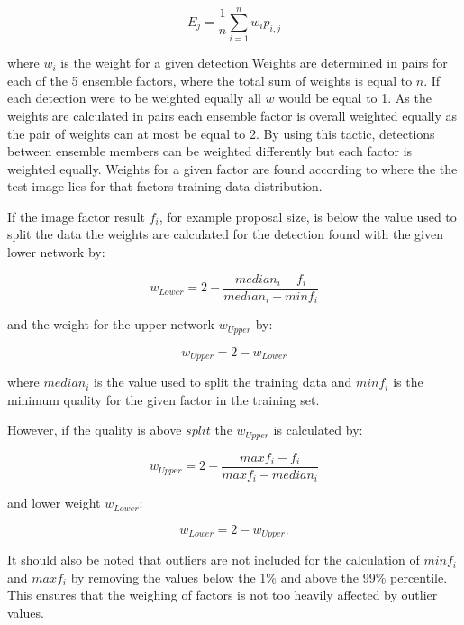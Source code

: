\documentclass[a4paper,twoside]{article}
\begin{document}
\begin{equation}
	E_{j} = \frac{1}{n} \sum_{i=1}^{n} w_ip_{i,j} 
\end{equation}

where $w_i$ is the weight for a given detection.Weights are determined in pairs for each of the 5 ensemble factors, where the total sum of weights is equal to $n$. If each detection were to be weighted equally all $w$ would be equal to 1. As the weights are calculated in pairs each ensemble factor is overall weighted equally as the pair of weights can at most be equal to 2. By using this tactic, detections between ensemble members can be weighted differently but each factor is weighted equally. Weights for a given factor are found according to where the the test image lies for that factors training data distribution. 

If the image factor result $f_i$, for example proposal size, is below the value used to split the data the weights are calculated for the detection found with the given lower network by:

\begin{equation}
	w_{Lower} = 2 - \frac{median_i - f_i}{median_i - minf_i}
\end{equation}

and the weight for the upper network $w_{Upper}$ by:

\begin{equation}
	w_{Upper} = 2 - w_{Lower}
\end{equation}

where $median_i$ is the value used to split the training data and $minf_i$ is the minimum quality for the given factor in the training set.

However, if the quality is above $split$ the $w_{Upper}$ is calculated by:

\begin{equation}
	w_{Upper} = 2 - \frac{maxf_i - f_i}{maxf_i - median_i}
\end{equation}

and lower weight $w_{Lower}$:

\begin{equation}
	w_{Lower} = 2 - w_{Upper}.
\end{equation}

It should also be noted that outliers are not included for the calculation of $minf_i$ and $maxf_i$ by removing the values below the 1\% and above the 99\% percentile. This ensures that the weighing of factors is not too heavily affected by outlier values.
\end{document}
